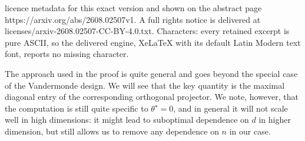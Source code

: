 \documentclass[10pt,a4paper]{amsart}
\newcommand{\thetastar}{\theta^\star}
\begin{document}
licence metadata for this exact version and shown on the abstract page https://arxiv.org/abs/2608.02507v1. A full rights notice is delivered at licenses/arxiv-2608.02507-CC-BY-4.0.txt. Characters: every retained excerpt is pure ASCII, so the delivered engine, XeLaTeX with its default Latin Modern text font, reports no missing character.
\begin{remark}
The approach used in the proof is quite general and goes beyond the special case of the Vandermonde design. We will see that the key quantity is the maximal diagonal entry of the corresponding orthogonal projector. We note, however, that the computation is still quite specific to $\thetastar = 0$, and in general it will not scale well in high dimensions: it might lead to suboptimal dependence on $d$ in higher dimension, but still allows us to remove any dependence on $n$ in our case.
\end{remark}
\end{document}
